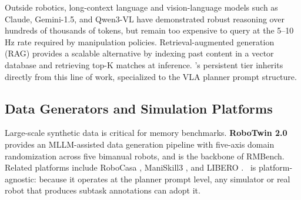Outside robotics, long-context language and vision-language models
such as Claude, Gemini-1.5, and Qwen3-VL \cite{qwen3vl} have
demonstrated robust reasoning over hundreds of thousands of tokens,
but remain too expensive to query at the 5--10\,Hz rate required by
manipulation policies. Retrieval-augmented generation (RAG)
\cite{lewis2020retrieval} provides a scalable alternative by
indexing past content in a vector database and retrieving top-K
matches at inference. \method's persistent tier inherits directly
from this line of work, specialized to the VLA planner prompt
structure.

\subsection{Data Generators and Simulation Platforms}

Large-scale synthetic data is critical for memory benchmarks.
\textbf{RoboTwin 2.0} \cite{robotwin2} provides an MLLM-assisted data
generation pipeline with five-axis domain randomization across five
bimanual robots, and is the backbone of RMBench. Related platforms
include RoboCasa \cite{robocasa}, ManiSkill3 \cite{maniskill3}, and
LIBERO \cite{libero}. \method\ is platform-agnostic: because it
operates at the planner prompt level, any simulator or real robot
that produces subtask annotations can adopt it.
